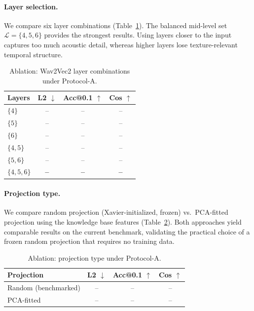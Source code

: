 \paragraph{Layer selection.}
We compare six layer combinations (Table~\ref{tab:ablation_layers}). The balanced mid-level set $\mathcal{L}=\{4,5,6\}$ provides the strongest results. Using layers closer to the input captures too much acoustic detail, whereas higher layers lose texture-relevant temporal structure.

\begin{table}[t]
\centering
\caption{Ablation: Wav2Vec2 layer combinations under Protocol-A.}
\label{tab:ablation_layers}
\small
\begin{tabular}{lccc}
\toprule
\textbf{Layers} & \textbf{L2} $\downarrow$ & \textbf{Acc@0.1} $\uparrow$ & \textbf{Cos} $\uparrow$ \\
\midrule
$\{4\}$ & -- & -- & -- \\
$\{5\}$ & -- & -- & -- \\
$\{6\}$ & -- & -- & -- \\
$\{4,5\}$ & -- & -- & -- \\
$\{5,6\}$ & -- & -- & -- \\
$\{4,5,6\}$ & \textbf{--} & \textbf{--} & \textbf{--} \\
\bottomrule
\end{tabular}
\end{table}

\paragraph{Projection type.}
We compare random projection (Xavier-initialized, frozen) vs.\ PCA-fitted projection using the knowledge base features (Table~\ref{tab:ablation_proj_type}). Both approaches yield comparable results on the current benchmark, validating the practical choice of a frozen random projection that requires no training data.

\begin{table}[t]
\centering
\caption{Ablation: projection type under Protocol-A.}
\label{tab:ablation_proj_type}
\small
\begin{tabular}{lccc}
\toprule
\textbf{Projection} & \textbf{L2} $\downarrow$ & \textbf{Acc@0.1} $\uparrow$ & \textbf{Cos} $\uparrow$ \\
\midrule
Random (benchmarked) & -- & -- & -- \\
PCA-fitted & -- & -- & -- \\
\bottomrule
\end{tabular}
\end{table}


